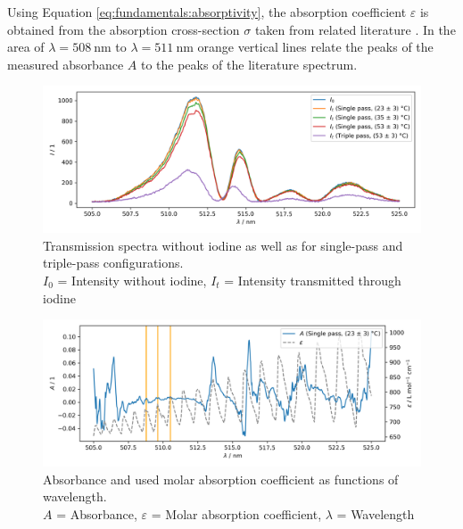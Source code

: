 Using Equation \ref{eq:fundamentals:absorptivity}, the absorption coefficient $\varepsilon$ is obtained from the absorption cross-section $\sigma$ taken from related literature \cite{Iodine}. In the area of $\lambda = \SI{508}{\nm}$ to $\lambda = \SI{511}{\nm}$ orange vertical lines relate the peaks of the measured absorbance $A$ to the peaks of the literature spectrum.

\begin{figure}[H]
    \centering
    \includegraphics[width=\textwidth]{graphics/transmission.png}
    \caption{Transmission spectra without iodine as well as for single-pass and triple-pass configurations.\\
        $I_0$ = Intensity without iodine, $I_t$ = Intensity transmitted through iodine}
    \label{fig:evaluation:transmission}
\end{figure}

\begin{figure}[H]
    \centering
    \includegraphics[width=\textwidth]{graphics/absorbance-25.png}
    \caption{Absorbance and used molar absorption coefficient as functions of wavelength.\\
        $A$ = Absorbance, $\varepsilon$ = Molar absorption coefficient, $\lambda$ = Wavelength}
    \label{fig:evaluation:absorbance:single:1}
\end{figure}

